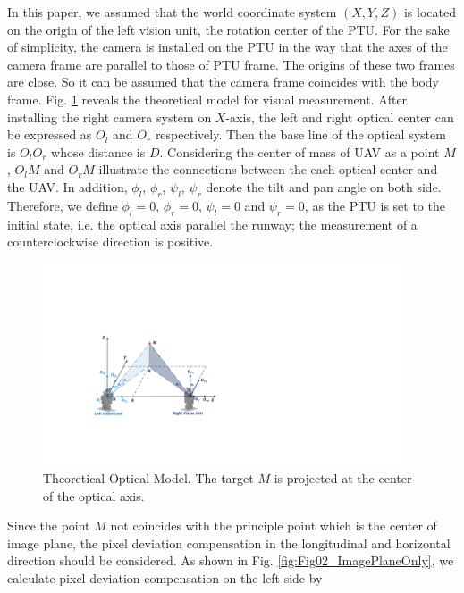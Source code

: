 In this paper, we assumed that the world coordinate system $(X, Y, Z)$ is located on the origin of the left vision unit, the rotation center of the PTU. For the sake of simplicity, the camera is installed on the PTU in the way that the axes of the camera frame are parallel to those of PTU frame. The origins of these two frames are close. So it can be assumed that the camera frame coincides with the body frame. Fig. \ref{fig:TheoreticalModel} reveals the theoretical model for visual measurement. After installing the right camera system on ${X}$-axis, the left and right optical center can be expressed as ${O_l}$ and ${O_r}$ respectively. Then the base line of the optical system is $O_lO_r$ whose distance is ${D}$. Considering the center of mass of UAV as a point ${M}$, ${O_lM}$ and ${O_rM}$ illustrate the connections between the each optical center and the UAV. In addition, ${\phi_l}$, ${\phi_r}$, ${\psi_l}$, ${\psi_r}$ denote the tilt and pan angle on both side. Therefore, we define $\phi_l= 0$, $\phi_r=0$, ${\psi_l=0}$ and ${\psi_r=0}$, as the PTU is set to the initial state, i.e. the optical axis parallel the runway; the measurement of a counterclockwise direction is positive.

\begin{figure}[!tb]
	\centering
	\includegraphics[height=6cm]{figs/Fig03_Stereo.pdf}	
	\caption{Theoretical Optical Model. The target $M$ is projected at the center of the optical axis.}
	\label{fig:TheoreticalModel}
\end{figure}


Since the point ${M}$ not coincides with the principle point which is the center of image plane, the pixel deviation compensation in the longitudinal and horizontal direction should be considered. As shown in Fig. \ref{fig:Fig02_ImagePlaneOnly}, we calculate pixel deviation compensation on the left side by 

